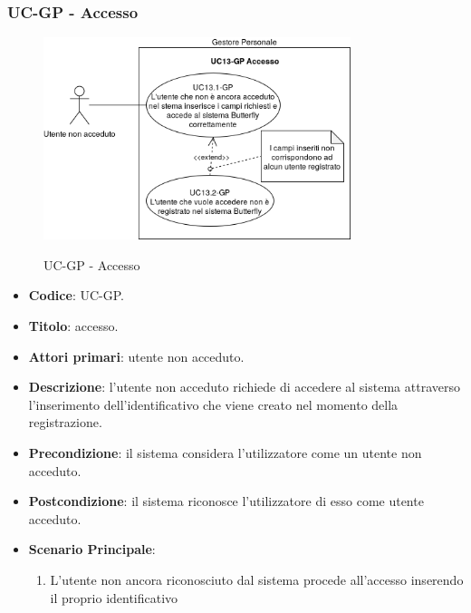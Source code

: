 \subsubsection{UC\theuccount-GP - Accesso}
		\begin{figure}[H]
			\centering
				\includegraphics[width=0.8\textwidth]{img/casi_d'uso/UC13.png}\\
			\caption{UC\theuccount-GP - Accesso}
		\end{figure}
	\begin{itemize}
		\item \textbf{Codice}: UC\theuccount-GP.
		\item \textbf{Titolo}: accesso.
		\item \textbf{Attori primari}: utente non acceduto.
		\item \textbf{Descrizione}: l'utente non acceduto richiede di accedere al sistema attraverso l'inserimento dell'identificativo che viene creato nel momento della registrazione.
		\item \textbf{Precondizione}: il sistema considera l’utilizzatore come un utente non acceduto.
		\item \textbf{Postcondizione}: il sistema riconosce l'utilizzatore di esso come utente acceduto.
		\item \textbf{Scenario Principale}:
		\begin{enumerate}
			\item L'utente non ancora riconosciuto dal sistema procede all'accesso inserendo il proprio identificativo
		\end{enumerate}
	\end{itemize}
	
